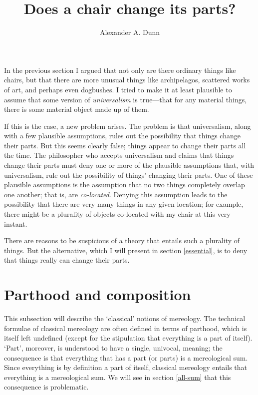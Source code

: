 \documentclass[11pt]{article}
\title{Does a chair change its parts?}
\author{Alexander A. Dunn}
\begin{document}
\ifstandalone
\maketitle
\begin{spacing}{1.5}
\fi

\label{parts}

In the previous section I argued that not only are there ordinary
things like chairs, but that there are more unusual things like
archipelagos, scattered works of art, and perhaps even dogbushes.  I
tried to make it at least plausible to assume that some version of
{\em universalism} is true---that for any material things, there is
some material object made up of them.

If this is the case, a new problem arises.  The problem is that
universalism, along with a few plausible assumptions, rules out the
possibility that things change their parts.  But this seems clearly
false; things appear to change their parts all the time.  The
philosopher who accepts universalism and claims that things change
their parts must deny one or more of the plausible assumptions that,
with universalism, rule out the possibility of things' changing their
parts.  One of these plausible assumptions is the assumption that no
two things completely overlap one another; that is, are {\em
  co-located}.  Denying this assumption leads to the possibility that
there are very many things in any given location; for example, there
might be a plurality of objects co-located with my chair at this very
instant.

There are reasons to be suspicious of a theory that entails such a
plurality of things.  But the alternative, which I will present in
section \ref{essential}, is to deny that things really can change
their parts.

\section{Parthood and composition}
\label{part-comp}
This subsection will describe the `classical' notions of mereology.
The technical formulae of classical mereology are often defined in
terms of parthood, which is itself left undefined (except for the
stipulation that everything is a part of itself).  `Part', moreover,
is understood to have a single, univocal, meaning; the consequence is
that everything that has a part (or parts) is a mereological sum.
Since everything is by definition a part of itself, classical
mereology entails that everything is a mereological sum.  We will see
in section \ref{all-sum} that this consequence is problematic.


\end{spacing}
\end{document}
